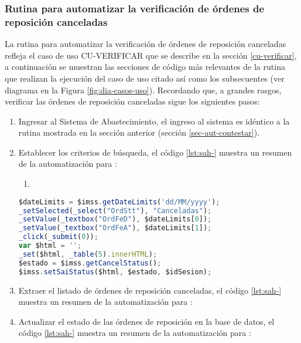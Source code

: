 \subsubsection{Rutina para automatizar la verificación de órdenes de reposición canceladas}
La rutina para automatizar la verificación de órdenes de reposición canceladas refleja el caso de uso  CU-VERIFICAR que se describe en la sección \ref{cu-verificar}, a continuación se muestran las secciones de código más relevantes de la rutina que realizan la ejecución del caso de uso citado así como los subsecuentes (ver diagrama en la Figura \ref{fig:dia-casos-uso}). Recordando que, a grandes rasgos, verificar las órdenes de reposición canceladas sigue los siguientes pasos:
\begin{enumerate}
	\item Ingresar al Sistema de Abastecimiento, el ingreso al sistema es idéntico a la rutina mostrada en la sección anterior (sección \ref{sec-aut-contestar}).

	\item Establecer los criterios de búsqueda, el código \ref{lst:sah-} muestra un resumen de la automatización para :
	\begin{enumerate}
		\item 
	\end{enumerate}
	\begin{lstlisting}[language=Javascript, caption={Responder orden de reposición.}, label={lst:sah-search}]
$dateLimits = $imss.getDateLimits('dd/MM/yyyy');
_setSelected(_select("OrdStt"), "Canceladas");
_setValue(_textbox("OrdFeD"), $dateLimits[0]);
_setValue(_textbox("OrdFeA"), $dateLimits[1]);
_click(_submit(0));
var $html = '';
_set($html, _table(5).innerHTML);
$estado = $imss.getCancelStatus();
$imss.setSaiStatus($html, $estado, $idSesion);
	\end{lstlisting}

	\item Extraer el listado de órdenes de reposición canceladas, el código \ref{lst:sah-} muestra un resumen de la automatización para :

	\item Actualizar el estado de las órdenes de reposición en la base de datos, el código \ref{lst:sah-} muestra un resumen de la automatización para :
\end{enumerate}










